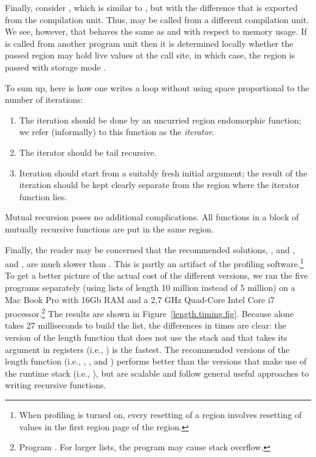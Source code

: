 \documentclass[12pt]{book}
\begin{document}
Finally, consider , which is similar to , but with the
difference that  is exported from the compilation unit. Thus,
 may be called from a different compilation unit. We see, however,
that  behaves the same as  and  with respect
to memory usage. If  is called from another program unit then it is
determined locally whether the passed region may hold live values at the call
site, in which case, the region is passed with storage mode .

To sum up, here is how one writes a loop without using space
proportional to the number of iterations:
%
\begin{enumerate}
\item The iteration should be done by an uncurried
  region endomorphic function; we refer (informally) to this
  function as the
  {\em iterator}.
\item The iterator should be tail recursive.
\item Iteration should start from a suitably fresh initial argument; the result
  of the iteration should be kept clearly separate from the region where the
  iterator function lies.
\end{enumerate}
Mutual recursion poses no additional complications. All functions in a block of
mutually recursive functions are put in the same region.

Finally, the reader may be concerned that the recommended solutions,
, and , and , are much slower than
. This is partly an artifact of the profiling
software.\footnote{When profiling is turned on, every resetting of a region
involves resetting of values in the first region page of the region.} To get a
better picture of the actual cost of the different versions, we ran the five
programs separately (using lists of length 10 million instead of 5 million) on a
Mac Book Pro with 16Gb RAM and a 2,7 GHz Quad-Core Intel Core i7
processor.\footnote{Program . For larger lists,
the  program may cause stack overflow.}  The results are shown in
Figure~\ref{length.timing.fig}. Because  alone takes 27 milliseconds to
build the list, the differences in times are clear: the version of the length
function that does not use the stack and that takes its argument in registers
(i.e., ) is the fastest. The recommended versions of the length
function (i.e., , , and ) performs better
than the versions that make use of the runtime stack (i.e., ), but
are scalable and follow general useful approaches to writing recursive
functions.
\end{document}
